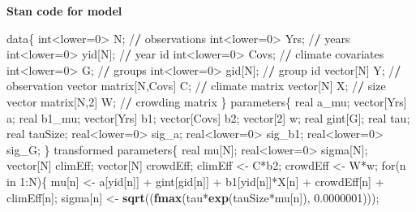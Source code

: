 \documentclass[12pt,]{article}
\newenvironment{Shaded}{\begin{snugshade}}{\end{snugshade}}
\newcommand{\KeywordTok}[1]{\textcolor[rgb]{0.13,0.29,0.53}{\textbf{{#1}}}}
\newcommand{\DecValTok}[1]{\textcolor[rgb]{0.00,0.00,0.81}{{#1}}}
\newcommand{\FloatTok}[1]{\textcolor[rgb]{0.00,0.00,0.81}{{#1}}}
\newcommand{\StringTok}[1]{\textcolor[rgb]{0.31,0.60,0.02}{{#1}}}
\newcommand{\ErrorTok}[1]{\textbf{{#1}}}
\newcommand{\NormalTok}[1]{{#1}}
\begin{document}
\textbf{Stan code for model}

\begin{Shaded}
\begin{Highlighting}[]
\NormalTok{data\{}
  \NormalTok{int<lower=}\DecValTok{0}\NormalTok{>}\StringTok{ }\NormalTok{N; /}\ErrorTok{/}\StringTok{ }\NormalTok{observations}
  \NormalTok{int<lower=}\DecValTok{0}\NormalTok{>}\StringTok{ }\NormalTok{Yrs; /}\ErrorTok{/}\StringTok{ }\NormalTok{years}
  \NormalTok{int<lower=}\DecValTok{0}\NormalTok{>}\StringTok{ }\NormalTok{yid[N]; /}\ErrorTok{/}\StringTok{ }\NormalTok{year id}
  \NormalTok{int<lower=}\DecValTok{0}\NormalTok{>}\StringTok{ }\NormalTok{Covs; /}\ErrorTok{/}\StringTok{ }\NormalTok{climate covariates}
  \NormalTok{int<lower=}\DecValTok{0}\NormalTok{>}\StringTok{ }\NormalTok{G; /}\ErrorTok{/}\StringTok{ }\NormalTok{groups}
  \NormalTok{int<lower=}\DecValTok{0}\NormalTok{>}\StringTok{ }\NormalTok{gid[N]; /}\ErrorTok{/}\StringTok{ }\NormalTok{group id}
  \NormalTok{vector[N] Y; /}\ErrorTok{/}\StringTok{ }\NormalTok{observation vector}
  \NormalTok{matrix[N,Covs] C; /}\ErrorTok{/}\StringTok{ }\NormalTok{climate matrix}
  \NormalTok{vector[N] X; /}\ErrorTok{/}\StringTok{ }\NormalTok{size vector}
  \NormalTok{matrix[N,}\DecValTok{2}\NormalTok{] W; /}\ErrorTok{/}\StringTok{ }\NormalTok{crowding matrix}
\NormalTok{\}}
\NormalTok{parameters\{}
  \NormalTok{real a_mu;}
  \NormalTok{vector[Yrs] a;}
  \NormalTok{real b1_mu;}
  \NormalTok{vector[Yrs] b1;}
  \NormalTok{vector[Covs] b2;}
  \NormalTok{vector[}\DecValTok{2}\NormalTok{] w;}
  \NormalTok{real gint[G];}
  \NormalTok{real tau;}
  \NormalTok{real tauSize;}
  \NormalTok{real<lower=}\DecValTok{0}\NormalTok{>}\StringTok{ }\NormalTok{sig_a;}
  \NormalTok{real<lower=}\DecValTok{0}\NormalTok{>}\StringTok{ }\NormalTok{sig_b1;}
  \NormalTok{real<lower=}\DecValTok{0}\NormalTok{>}\StringTok{ }\NormalTok{sig_G;}
\NormalTok{\}}
\NormalTok{transformed parameters\{}
  \NormalTok{real mu[N];}
  \NormalTok{real<lower=}\DecValTok{0}\NormalTok{>}\StringTok{ }\NormalTok{sigma[N];}
  \NormalTok{vector[N] climEff;}
  \NormalTok{vector[N] crowdEff;}
  \NormalTok{climEff <-}\StringTok{ }\NormalTok{C*b2;}
  \NormalTok{crowdEff <-}\StringTok{ }\NormalTok{W*w;}
  \NormalTok{for(n in }\DecValTok{1}\NormalTok{:N)\{}
    \NormalTok{mu[n] <-}\StringTok{ }\NormalTok{a[yid[n]] +}\StringTok{ }\NormalTok{gint[gid[n]] +}\StringTok{ }\NormalTok{b1[yid[n]]*X[n] +}\StringTok{ }\NormalTok{crowdEff[n] +}\StringTok{ }\NormalTok{climEff[n];}
    \NormalTok{sigma[n] <-}\StringTok{ }\KeywordTok{sqrt}\NormalTok{((}\KeywordTok{fmax}\NormalTok{(tau*}\KeywordTok{exp}\NormalTok{(tauSize*mu[n]), }\FloatTok{0.0000001}\NormalTok{)));  }

\end{Highlighting}
\end{Shaded}
\end{document}
